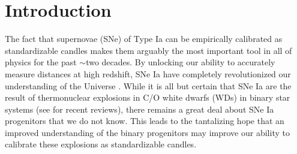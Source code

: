\documentclass[twocolumn]{./aastex63}
\begin{document}


\section{Introduction}

The fact that supernovae (SNe) of Type Ia can be empirically calibrated as
standardizable candles makes them arguably the most important tool in all of
physics for the past $\sim$two decades. By unlocking our ability to accurately
measure distances at high redshift, SNe Ia have completely revolutionized our
understanding of the Universe \citep{Riess98,Perlmutter99}. While it is all but
certain that SNe Ia are the result of thermonuclear explosions in C/O white
dwarfs (WDs) in binary star systems (see \citep{Maoz14,Livio18} for recent reviews), there remains a great
deal about SNe Ia progenitors that we do not know. This leads to the tantalizing
hope that an improved understanding of the binary progenitors may improve our
ability to calibrate these explosions as standardizable candles.
\end{document}
